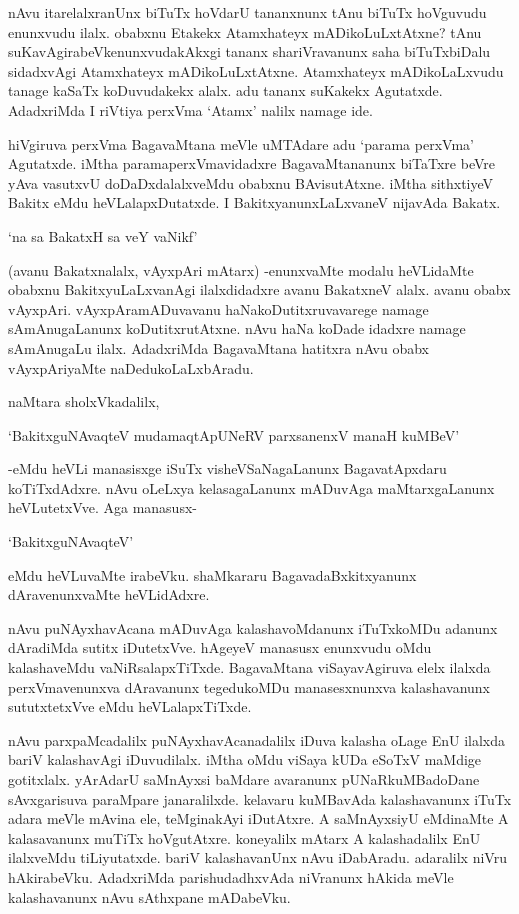 nAvu itarelalxranUnx biTuTx hoVdarU tananxnunx tAnu biTuTx hoVguvudu enunxvudu ilalx. obabxnu Etakekx Atamxhateyx mADikoLuLxtAtxne? tAnu suKavAgirabeVkenunxvudakAkxgi tananx shariVravanunx saha biTuTxbiDalu sidadxvAgi Atamxhateyx mADikoLuLxtAtxne. Atamxhateyx mADikoLaLxvudu tanage kaSaTx koDuvudakekx alalx. adu tananx suKakekx Agutatxde. AdadxriMda I riVtiya perxVma `Atamx' nalilx namage ide.

hiVgiruva perxVma BagavaMtana meVle uMTAdare adu `parama perxVma' Agutatxde. iMtha paramaperxVmavidadxre BagavaMtananunx biTaTxre beVre yAva vasutxvU doDaDxdalalxveMdu obabxnu BAvisutAtxne. iMtha sithxtiyeV Bakitx eMdu heVLalapxDutatxde. I BakitxyanunxLaLxvaneV nijavAda Bakatx.

\begin{shloka}
`na sa BakatxH sa veY vaNikf'
\end{shloka}

(avanu Bakatxnalalx, vAyxpAri mAtarx) -enunxvaMte modalu heVLidaMte obabxnu BakitxyuLaLxvanAgi ilalxdidadxre avanu BakatxneV alalx. avanu obabx vAyxpAri. vAyxpAramADuvavanu haNakoDutitxruvavarege namage sAmAnugaLanunx koDutitxrutAtxne. nAvu haNa koDade idadxre namage sAmAnugaLu ilalx. AdadxriMda BagavaMtana hatitxra nAvu obabx vAyxpAriyaMte naDedukoLaLxbAradu.

naMtara sholxVkadalilx,

\begin{shloka}
`BakitxguNAvaqteV mudamaqtApUNeRV parxsanenxV manaH kuMBeV'
\end{shloka}

-eMdu heVLi manasisxge iSuTx visheVSaNagaLanunx BagavatApxdaru koTiTxdAdxre. nAvu oLeLxya kelasagaLanunx mADuvAga maMtarxgaLanunx heVLutetxVve. Aga manasusx-

\begin{shloka}
`BakitxguNAvaqteV'
\end{shloka}

eMdu heVLuvaMte irabeVku. shaMkararu BagavadaBxkitxyanunx dAravenunxvaMte heVLidAdxre.

nAvu puNAyxhavAcana mADuvAga kalashavoMdanunx iTuTxkoMDu adanunx dAradiMda sutitx iDutetxVve. hAgeyeV manasusx enunxvudu oMdu kalashaveMdu vaNiRsalapxTiTxde. BagavaMtana viSayavAgiruva elelx ilalxda perxVmavenunxva dAravanunx tegedukoMDu manasesxnunxva kalashavanunx sututxtetxVve eMdu heVLalapxTiTxde.

nAvu parxpaMcadalilx puNAyxhavAcanadalilx iDuva kalasha oLage EnU ilalxda bariV kalashavAgi iDuvudilalx. iMtha oMdu viSaya kUDa eSoTxV maMdige gotitxlalx. yArAdarU saMnAyxsi baMdare avaranunx pUNaRkuMBadoDane sAvxgarisuva paraMpare janaralilxde. kelavaru kuMBavAda kalashavanunx iTuTx adara meVle mAvina ele, teMginakAyi iDutAtxre. A saMnAyxsiyU eMdinaMte A kalasavanunx muTiTx hoVgutAtxre. koneyalilx mAtarx A kalashadalilx EnU ilalxveMdu tiLiyutatxde. bariV kalashavanUnx nAvu iDabAradu. adaralilx niVru hAkirabeVku. AdadxriMda parishudadhxvAda niVranunx hAkida meVle kalashavanunx nAvu sAthxpane mADabeVku.

